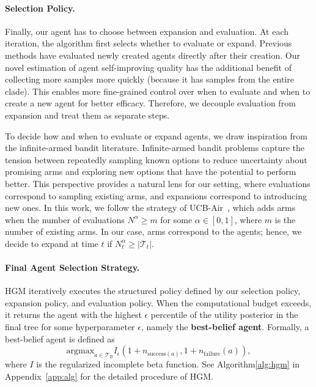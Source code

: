 \documentclass{article}
\begin{document}
\paragraph{Selection Policy.}

Finally, our agent has to choose between expansion and evaluation.
At each iteration, the algorithm first selects whether to evaluate or expand. Previous methods have evaluated newly created agents directly after their creation. 
Our novel estimation of agent self-improving quality has the additional benefit of collecting more samples more quickly (because it has samples from the entire clade). 
This enables more fine-grained control over when to evaluate and when to create a new agent for better efficacy. 
Therefore, we decouple evaluation from expansion and treat them as separate steps.

To decide how and when to evaluate or expand agents, we draw inspiration from the infinite-armed bandit literature. Infinite-armed bandit problems capture the tension between repeatedly sampling known options to reduce uncertainty about promising arms and exploring new options that have the potential to perform better. This perspective provides a natural lens for our setting, where evaluations correspond to sampling existing arms, and expansions correspond to introducing new ones.
In this work, we follow the strategy of UCB-Air~\citep{NIPS200849ae49a2}, which adds arms when the number of evaluations $N^\alpha \geq m$ for some $\alpha \in [0, 1]$, where $m$ is the number of existing arms. In our case, arms correspond to the agents; hence, we decide to expand at time $t$ if $N_t^\alpha \geq |\mathcal{T}_t|$.



\paragraph{Final Agent Selection Strategy.}\label{method:final-agent-select}
HGM iteratively executes the structured policy defined by our selection policy, expansion policy, and evaluation policy. When the computational budget exceeds, it returns the agent with the highest $\epsilon$ percentile of the utility posterior in the final tree for some hyperparameter $\epsilon$, namely the \textbf{best-belief agent}. Formally, a best-belief agent is defined as
\[
\text{argmax}_{a\in \mathcal{T}_B} I_\epsilon(1 + n_{\text{success}(a)}, 1 + n_{\text{failure}}(a)),
\]
where $I$ is the regularized incomplete beta function. See Algorithm\ref{alg:hgm} in Appendix~\ref{app:alg} for the detailed procedure of HGM.
\end{document}
